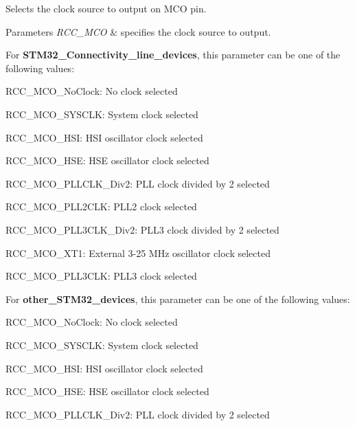Selects the clock source to output on M\+CO pin. 


\begin{DoxyParams}{Parameters}
{\em R\+C\+C\+\_\+\+M\+CO} & specifies the clock source to output.\\
\hline
\end{DoxyParams}
For {\bfseries{S\+T\+M32\+\_\+\+Connectivity\+\_\+line\+\_\+devices}}, this parameter can be one of the following values\+:

\begin{DoxyItemize}
\item R\+C\+C\+\_\+\+M\+C\+O\+\_\+\+No\+Clock\+: No clock selected \item R\+C\+C\+\_\+\+M\+C\+O\+\_\+\+S\+Y\+S\+C\+LK\+: System clock selected \item R\+C\+C\+\_\+\+M\+C\+O\+\_\+\+H\+SI\+: H\+SI oscillator clock selected \item R\+C\+C\+\_\+\+M\+C\+O\+\_\+\+H\+SE\+: H\+SE oscillator clock selected \item R\+C\+C\+\_\+\+M\+C\+O\+\_\+\+P\+L\+L\+C\+L\+K\+\_\+\+Div2\+: P\+LL clock divided by 2 selected \item R\+C\+C\+\_\+\+M\+C\+O\+\_\+\+P\+L\+L2\+C\+LK\+: P\+L\+L2 clock selected\end{DoxyItemize}
\begin{DoxyItemize}
\item R\+C\+C\+\_\+\+M\+C\+O\+\_\+\+P\+L\+L3\+C\+L\+K\+\_\+\+Div2\+: P\+L\+L3 clock divided by 2 selected\end{DoxyItemize}
\begin{DoxyItemize}
\item R\+C\+C\+\_\+\+M\+C\+O\+\_\+\+X\+T1\+: External 3-\/25 M\+Hz oscillator clock selected\end{DoxyItemize}
\begin{DoxyItemize}
\item R\+C\+C\+\_\+\+M\+C\+O\+\_\+\+P\+L\+L3\+C\+LK\+: P\+L\+L3 clock selected\end{DoxyItemize}
For {\bfseries{other\+\_\+\+S\+T\+M32\+\_\+devices}}, this parameter can be one of the following values\+:

\begin{DoxyItemize}
\item R\+C\+C\+\_\+\+M\+C\+O\+\_\+\+No\+Clock\+: No clock selected \item R\+C\+C\+\_\+\+M\+C\+O\+\_\+\+S\+Y\+S\+C\+LK\+: System clock selected \item R\+C\+C\+\_\+\+M\+C\+O\+\_\+\+H\+SI\+: H\+SI oscillator clock selected \item R\+C\+C\+\_\+\+M\+C\+O\+\_\+\+H\+SE\+: H\+SE oscillator clock selected \item R\+C\+C\+\_\+\+M\+C\+O\+\_\+\+P\+L\+L\+C\+L\+K\+\_\+\+Div2\+: P\+LL clock divided by 2 selected\end{DoxyItemize}

